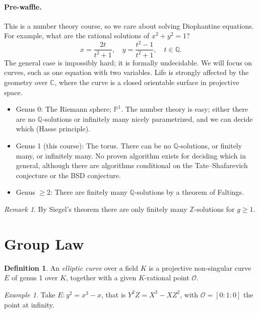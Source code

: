 \documentclass[a4paper]{article}
\theoremstyle{plain}
\theoremstyle{remark}
\newtheorem*{remark}{Remark}
\newtheorem*{example}{Example}
\theoremstyle{definition}
\newtheorem*{definition}{Definition}
\renewcommand{\P}{\mathbb{P}}
\renewcommand{\O}{\mathcal{O}}
\newcommand{\Z}{\mathbb{Z}}
\newcommand{\Q}{\mathbb{Q}}
\newcommand{\C}{\mathbb{C}}
\begin{document}
\paragraph{Pre-waffle.}
This is a number theory course, so we care about solving Diophantine equations.
For example, what are the rational solutions of $x^2+y^2=1$?
\begin{equation*}
    x = \frac{2t}{t^2+1}, \quad y = \frac{t^2-1}{t^2+1}, \quad t\in\Q.
\end{equation*}
The general case is impossibly hard; it is formally undecidable. We will focus
on curves, such as one equation with two variables. Life is strongly affected by
the geometry over $\C$, where the curve is a closed orientable surface in
projective space.
\begin{itemize}
    \item Genus 0: The Riemann sphere; $\P^1$. The number theory is easy; either
        there are no $\Q$-solutions or infinitely many nicely parametrized, and
        we can decide which (Hasse principle).

    \item Genus 1 (this course): The torus. There can be no $\Q$-solutions, or
        finitely many, or infinitely many. No proven algorithm exists for
        deciding which in general, although there are algorithms conditional on
        the Tate--Shafarevich conjecture or the BSD conjecture.

    \item Genus $\ge2$: There are finitely many $\Q$-solutions by a theorem of
        Faltings.
\end{itemize}

\begin{remark}
    By Siegel's theorem there are only finitely many $\Z$-solutions for $g\ge1$.
\end{remark}

\section{Group Law}

\begin{definition}
    An \emph{elliptic curve} over a field $K$ is a projective non-singular curve
    $E$ of genus 1 over $K$, together with a given $K$-rational point $\O$.
\end{definition}

\begin{example}
    Take $E:y^2=x^3-x$, that is $Y^2Z=X^3-XZ^2$, with $\O=[0:1:0]$ the
    point at infinity.
\end{example}
\end{document}
